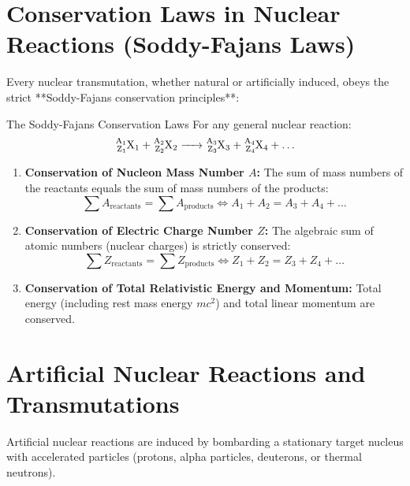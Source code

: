 \section{Conservation Laws in Nuclear Reactions (Soddy-Fajans Laws)}

Every nuclear transmutation, whether natural or artificially induced, obeys the strict **Soddy-Fajans conservation principles**:

\begin{lawbox}{The Soddy-Fajans Conservation Laws}
For any general nuclear reaction:
\begin{equation}
\ce{^{A_1}_{Z_1}X_1 + ^{A_2}_{Z_2}X_2 -> ^{A_3}_{Z_3}X_3 + ^{A_4}_{Z_4}X_4 + \dots}
\end{equation}
\begin{enumerate}[leftmargin=1.5em,itemsep=3pt]
  \item \textbf{Conservation of Nucleon Mass Number $A$:} The sum of mass numbers of the reactants equals the sum of mass numbers of the products:
  \begin{equation}
  \sum A_{\text{reactants}} = \sum A_{\text{products}} \iff A_1 + A_2 = A_3 + A_4 + \dots
  \end{equation}
  \item \textbf{Conservation of Electric Charge Number $Z$:} The algebraic sum of atomic numbers (nuclear charges) is strictly conserved:
  \begin{equation}
  \sum Z_{\text{reactants}} = \sum Z_{\text{products}} \iff Z_1 + Z_2 = Z_3 + Z_4 + \dots
  \end{equation}
  \item \textbf{Conservation of Total Relativistic Energy and Momentum:} Total energy (including rest mass energy $m c^2$) and total linear momentum are conserved.
\end{enumerate}
\end{lawbox}

\section{Artificial Nuclear Reactions and Transmutations}

Artificial nuclear reactions are induced by bombarding a stationary target nucleus with accelerated particles (protons, alpha particles, deuterons, or thermal neutrons).

